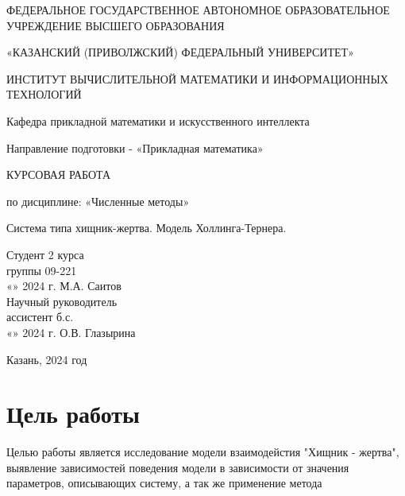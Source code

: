 \documentclass[a4paper,12pt]{article}
\begin{document}
\renewcommand\contentsname{Содержание}
\renewcommand{\arraystretch}{1.3} 
\thispagestyle{empty}
\begin{center}
    ФЕДЕРАЛЬНОЕ ГОСУДАРСТВЕННОЕ АВТОНОМНОЕ ОБРАЗОВАТЕЛЬНОЕ
    УЧРЕЖДЕНИЕ ВЫСШЕГО ОБРАЗОВАНИЯ
    \vspace{0.1cm}

    «КАЗАНСКИЙ (ПРИВОЛЖСКИЙ)  ФЕДЕРАЛЬНЫЙ УНИВЕРСИТЕТ»
    \vspace{0.1cm}

    ИНСТИТУТ ВЫЧИСЛИТЕЛЬНОЙ МАТЕМАТИКИ И ИНФОРМАЦИОННЫХ ТЕХНОЛОГИЙ

    Кафедра прикладной математики и искусственного интеллекта

    Направление подготовки - «Прикладная математика»
\end{center}
\vspace{2cm}

\begin{center}
    КУРСОВАЯ РАБОТА
    \vspace{0.2cm}
 
    по дисциплине: «Численные методы»
    \vspace{0.2cm}
 
    Система типа хищник-жертва. Модель Холлинга-Тернера.
\end{center}

\vspace{3cm}
\noindent Студент 2 курса\\
группы 09-221\\
«\underline{\qquad}» \underline{\qquad\qquad} 2024 г. \qquad\qquad\quad \underline{\qquad\qquad\qquad\quad} \qquad М.А. Саитов\\
Научный руководитель\\
ассистент б.с.\\
«\underline{\qquad}» \underline{\qquad\qquad} 2024 г. \qquad\qquad\quad \underline{\qquad\qquad\qquad\quad} \qquad О.В. Глазырина

\vfill
\begin{center} \large{Казань, 2024 год} \end{center}
\thispagestyle{empty}
 

\newpage
\begin{center}
\renewcommand{\contentsname}{Содержание}
\fontsize{14}{1.15}\selectfont
\mdseries\selectfont{\tableofcontents}
\newpage
\end{center}
\setlength{\parindent}{1.25cm}
\newpage

\section{Цель работы}
\hspace{0.5cm} Целью работы является исследование модели взаимодейстия "Хищник - жертва",
выявление зависимостей поведения модели в зависимости от значения параметров,
описывающих систему, а так же применение метода
\end{document}
